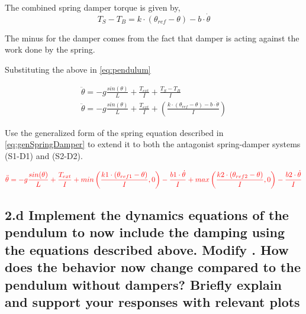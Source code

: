\documentclass{cmc}
\begin{document}
The combined spring damper torque is given by,
\begin{equation}
  \label{eq:spring_damper}
  T_{S} - T_{B} = k \cdot (\theta_{ref} - \theta) - b \cdot \dot{\theta}
\end{equation}

The minus for the damper comes from the fact that damper is acting
against the work done by the spring.

Substituting the above in \ref{eq:pendulum}

\begin{eqnarray}
  \label{eq:spring-damper}
  \ddot{\theta} = -g\frac{sin(\theta)}{L} + \frac{T_{ext}}{I} + \frac{T_{S} - T_{B}}{I} \\
  \ddot{\theta} = -g\frac{sin(\theta)}{L}+ \frac{T_{ext}}{I} + (\frac{k \cdot (\theta_{ref} - \theta) - b \cdot \dot{\theta}}{I}) \label{eq:genSpringDamper}
\end{eqnarray}

Use the generalized form of the spring equation described in
\ref{eq:genSpringDamper} to extend it to both the antagonist
spring-damper systems (S1-D1) and (S2-D2).

\begin{equation}
  \textcolor{red}{\ddot{\theta} = -g\frac{sin(\theta)}{L} + \frac{T_{ext}}{I} + min \left(\frac{k1 \cdot (\theta_{ref1} - \theta)}{I}, 0 \right) - \frac{b1 \cdot \dot{\theta}}{I} + max \left(\frac{k2 \cdot (\theta_{ref2} - \theta)}{I}, 0 \right) - \frac{b2 \cdot \dot{\theta}}{I} }
\end{equation}


\subsection*{2.d Implement the dynamics equations of the pendulum to
  now include the damping using the equations described above. Modify
  .  How does the
  behavior now change compared to the pendulum without dampers? Briefly explain and support your
  responses with relevant plots}
\end{document}
